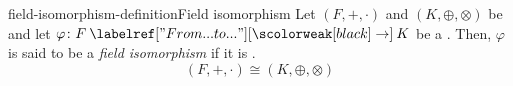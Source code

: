 \documentclass[preview]{standalone}
\begin{document}
\begin{snippetdefinition}{field-isomorphism-definition}{Field isomorphism}
    Let \((F, +, \cdot)\) and \((K, \oplus, \otimes)\) be \field[fields] and let
    \(\varphi\colon F \fromto K\) be a \fieldhomomorphism.
    Then, \(\varphi\) is said to be a \emph{field isomorphism} if it is \bijective.
    \[
        (F, +, \cdot) \cong (K, \oplus, \otimes)
    \]
\end{snippetdefinition}
\end{document}
